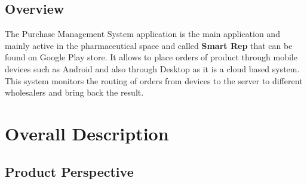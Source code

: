 \documentclass[a4paper,10pt]{article}
\begin{document}
	\subsection{Overview} 
	The Purchase Management System application is the main application and mainly active in the pharmaceutical space and called \textbf{Smart Rep} that can be found on Google Play store. It allows to place orders of product through mobile devices such as Android and also through Desktop as it is a cloud based system. This system monitors the routing of orders from devices to the server to different wholesalers and bring back the result.

\section{Overall Description}

\subsection{Product Perspective}
\end{document}
